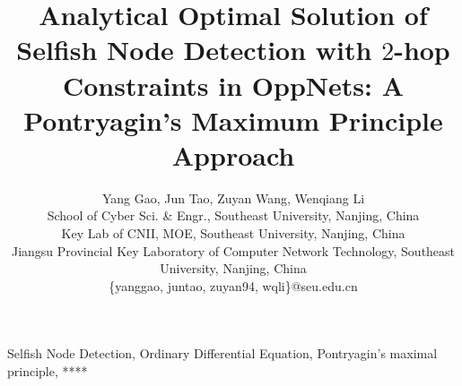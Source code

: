 \documentclass[conference]{IEEEtran}
\begin{document}
%
\title{
Analytical Optimal Solution of Selfish Node Detection with $2$-hop Constraints in OppNets: A Pontryagin's Maximum Principle Approach
}
\author{Yang Gao, Jun Tao, Zuyan Wang, Wenqiang Li\\
        School of Cyber Sci. \& Engr., Southeast University, Nanjing, China\\
        Key Lab of CNII, MOE, Southeast University, Nanjing, China\\
        Jiangsu Provincial Key Laboratory of Computer Network Technology, Southeast University, Nanjing, China\\
        \{yanggao, juntao, zuyan94, wqli\}@seu.edu.cn
        }
\maketitle



%
\begin{IEEEkeywords}
Selfish Node Detection, Ordinary Differential Equation, Pontryagin's maximal principle, ****
\end{IEEEkeywords}












\end{document}
